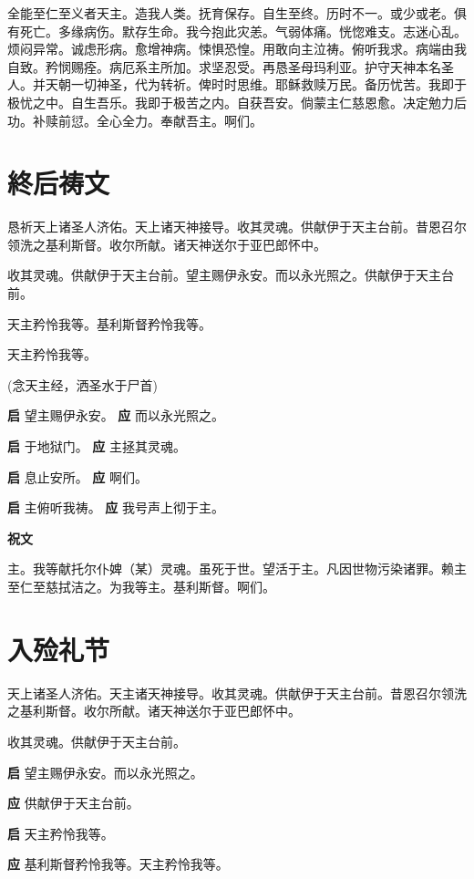 \documentclass[UTF8,17pt]{ctexart}
\begin{document}
全能⾄仁⾄义者天主。造我⼈类。抚育保存。⾃⽣⾄终。历时不⼀。或少或⽼。俱有死亡。多缘病伤。默存⽣命。我今抱此灾恙。⽓弱体痛。恍惚难⽀。志迷⼼乱。烦闷异常。诚虑形病。愈增神病。悚惧恐惶。⽤敢向主泣祷。俯听我求。病端由我⾃致。矜悯赐痊。病厄系主所加。求坚忍受。再恳圣母玛利亚。护守天神本名圣⼈。并天朝⼀切神圣，代为转祈。俾时时思维。耶稣救赎万民。备历忧苦。我即于极忧之中。⾃⽣吾乐。我即于极苦之内。⾃获吾安。倘蒙主仁慈恩愈。决定勉⼒后功。补赎前愆。全⼼全⼒。奉献吾主。啊们。

\section{終后祷⽂}

恳祈天上诸圣⼈济佑。天上诸天神接导。收其灵魂。供献伊于天主台前。昔恩召尔领洗之基利斯督。收尔所献。诸天神送尔于亚巴郎怀中。

收其灵魂。供献伊于天主台前。望主赐伊永安。⽽以永光照之。供献伊于天主台前。

天主矜怜我等。基利斯督矜怜我等。

天主矜怜我等。

(念天主经，洒圣⽔于⼫⾸)

\textbf{启} \quad 望主赐伊永安。 \hfill \textbf{应} \quad ⽽以永光照之。\phantom{c}

\textbf{启} \quad 于地狱门。 \hfill \textbf{应} \quad 主拯其灵魂。\phantom{CC}

\textbf{启} \quad 息⽌安所。 \hfill \textbf{应} \quad 啊们。\phantom{CCCCCCc}

\textbf{启} \quad 主俯听我祷。 \hfill \textbf{应} \quad 我号声上彻于主。

\textbf{祝⽂}

主。我等献托尔仆婢（某）灵魂。虽死于世。望活于主。凡因世物污染诸罪。赖主⾄仁⾄慈拭洁之。为我等主。基利斯督。啊们。

\section{⼊殓礼节}

天上诸圣⼈济佑。天主诸天神接导。收其灵魂。供献伊于天主台前。昔恩召尔领洗之基利斯督。收尔所献。诸天神送尔于亚巴郎怀中。

收其灵魂。供献伊于天主台前。

\textbf{启} \quad 望主赐伊永安。⽽以永光照之。

\textbf{应} \quad 供献伊于天主台前。

\textbf{启} \quad 天主矜怜我等。

\textbf{应} \quad 基利斯督矜怜我等。天主矜怜我等。
\end{document}
